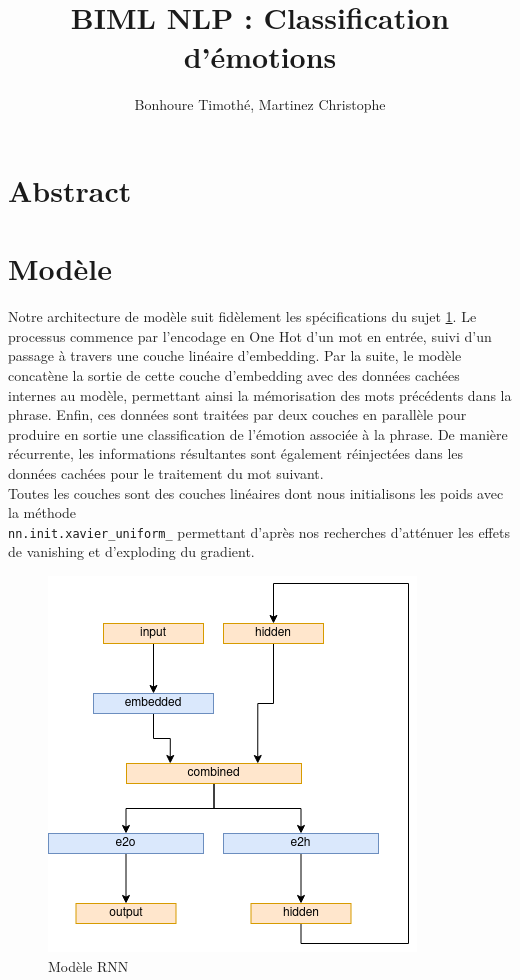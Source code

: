 \documentclass{article}
\begin{document}
\renewcommand{\arraystretch}{1.5}

\title{BIML NLP : Classification d'émotions \\
\footnotesize{}}
\author{Bonhoure Timothé, Martinez Christophe}                      %

\maketitle
\tableofcontents
\section*{Abstract}
\newpage

\section{Modèle}
Notre architecture de modèle suit fidèlement les spécifications du sujet \ref{fig:modele_rnn}. Le processus commence par l'encodage en One Hot d'un mot en entrée, suivi d'un passage à travers une couche linéaire d'embedding. Par la suite, le modèle concatène la sortie de cette couche d'embedding avec des données cachées internes au modèle, permettant ainsi la mémorisation des mots précédents dans la phrase. Enfin, ces données sont traitées par deux couches en parallèle pour produire en sortie une classification de l'émotion associée à la phrase. De manière récurrente, les informations résultantes sont également réinjectées dans les données cachées pour le traitement du mot suivant. \\
Toutes les couches sont des couches linéaires dont nous initialisons les poids avec la méthode\\ \texttt{nn.init.xavier\_uniform\_} permettant d'après nos recherches d'atténuer les effets de vanishing et d'exploding du gradient.

\begin{figure}[H]
    \centering
    \includegraphics[width=0.4\linewidth]{img/modele.png}
    \caption{Modèle RNN}

    \label{fig:modele_rnn}
\end{figure}
\end{document}
